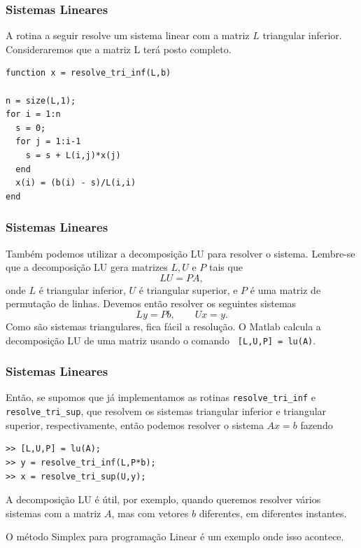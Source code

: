 \documentclass{beamer}
\newcommand{\ssiz}{\scriptsize}
\begin{document}
\begin{frame}[fragile]
\frametitle{Sistemas Lineares}

A rotina a seguir resolve um sistema linear com a matriz $L$ triangular
inferior. Consideraremos que a matriz L ter\'a posto completo.
\pause

{\ssiz
\begin{verbatim}
function x = resolve_tri_inf(L,b)

n = size(L,1);
for i = 1:n
  s = 0;
  for j = 1:i-1
    s = s + L(i,j)*x(j)
  end
  x(i) = (b(i) - s)/L(i,i)
end
\end{verbatim}
}

\end{frame}


\begin{frame}[fragile]
\frametitle{Sistemas Lineares}

Tamb\'em podemos utilizar a decomposi\c{c}\~ao LU para resolver o sistema.
Lembre-se que a decomposi\c{c}\~ao LU gera matrizes $L,U$ e $P$ tais que
$$LU = PA,$$
\pause
onde $L$ \'e triangular inferior, $U$ \'e triangular superior, e $P$ \'e uma
matriz de permuta\c{c}\~ao de linhas. Devemos ent\~ao resolver os seguintes
sistemas
$$Ly = Pb, \qquad Ux = y.$$
\pause
Como s\~ao sistemas triangulares, fica f\'acil a resolu\c{c}\~ao.
O Matlab calcula a decomposi\c{c}\~ao LU de uma matriz usando o comando {\tt
[L,U,P] = lu(A)}.
\end{frame}


\begin{frame}[fragile]
\frametitle{Sistemas Lineares}

Ent\~ao, se supomos que j\'a implementamos as rotinas {\tt resolve\_tri\_inf} e
{\tt resolve\_tri\_sup}, que resolvem os sistemas triangular inferior e
triangular superior, respectivamente, ent\~ao podemos resolver o sistema $Ax=b$
fazendo
\pause
\begin{verbatim}
>> [L,U,P] = lu(A);
>> y = resolve_tri_inf(L,P*b);
>> x = resolve_tri_sup(U,y);
\end{verbatim}
\pause

A decomposi\c{c}\~ao LU \'e \'util, por exemplo, quando queremos resolver
v\'arios sistemas com a matriz $A$, mas com vetores $b$ diferentes, em
diferentes instantes.
\pause

O m\'etodo Simplex para programa\c{c}\~ao Linear \'e um exemplo onde isso
acontece.

\end{frame}
\end{document}
